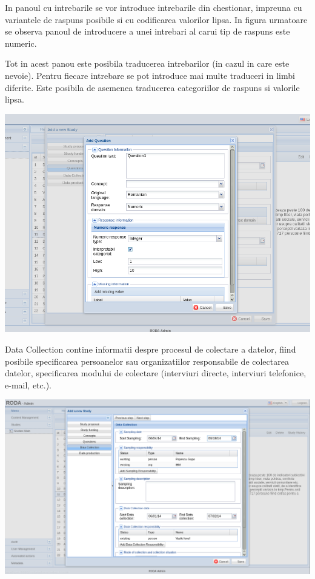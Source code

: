 In panoul cu intrebarile se vor introduce intrebarile din chestionar, impreuna cu variantele de raspuns posibile si cu codificarea valorilor lipsa. In figura urmatoare se observa panoul de introducere a unei intrebari al carui tip de raspuns este numeric. 

Tot in acest panou este posibila traducerea intrebarilor (in cazul in care este nevoie). Pentru fiecare intrebare se pot introduce mai multe traduceri in limbi diferite. Este posibila de asemenea traducerea categoriilor de raspuns si valorile lipsa. 

\includegraphics[width=16cm]{img/ddi-editor-addquestion}


Data Collection contine informatii despre procesul de colectare a datelor, fiind posibile specificarea persoanelor sau organizatiilor responsabile de colectarea datelor, specificarea modului de colectare (interviuri directe, interviuri telefonice, e-mail, etc.).

\includegraphics[width=16cm]{img/ddi-editor-datacollection}

